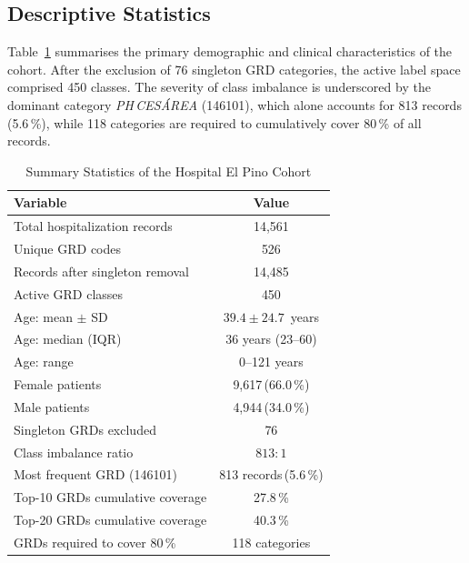 \documentclass[journal]{IEEEtran}
\begin{document}
\subsection{Descriptive Statistics}

Table~\ref{tab:stats} summarises the primary demographic and
clinical characteristics of the cohort.  After the exclusion
of 76 singleton GRD categories, the active label space
comprised 450 classes.  The severity of class imbalance is
underscored by the dominant category \textit{PH\,CES\'AREA}
(146101), which alone accounts for 813 records (5.6\,\%), while
118 categories are required to cumulatively cover 80\,\% of all
records.

\begin{table}[!t]
  \caption{Summary Statistics of the Hospital El Pino Cohort}
  \label{tab:stats}
  \centering
  \renewcommand{\arraystretch}{1.15}
  \begin{tabular}{@{}lc@{}}
    \toprule
    \textbf{Variable} & \textbf{Value} \\
    \midrule
    Total hospitalization records       & 14,561 \\
    Unique GRD codes                    & 526 \\
    Records after singleton removal     & 14,485 \\
    Active GRD classes                  & 450 \\
    \midrule
    Age: mean $\pm$ SD                  & $39.4 \pm 24.7$~years \\
    Age: median (IQR)                   & 36 years (23--60) \\
    Age: range                          & 0--121 years \\
    \midrule
    Female patients                     & 9,617\,(66.0\,\%) \\
    Male patients                       & 4,944\,(34.0\,\%) \\
    \midrule
    Singleton GRDs excluded             & 76 \\
    Class imbalance ratio               & $813{:}1$ \\
    Most frequent GRD (146101)          & 813 records\,(5.6\,\%) \\
    Top-10 GRDs cumulative coverage     & 27.8\,\% \\
    Top-20 GRDs cumulative coverage     & 40.3\,\% \\
    GRDs required to cover 80\,\%       & 118 categories \\
    \bottomrule
  \end{tabular}
\end{table}
\end{document}
